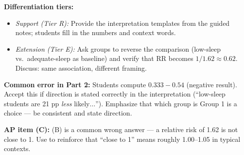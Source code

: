 \documentclass[10pt]{article}
\begin{document}
\begin{teachernote}
\textbf{Differentiation tiers:}
\begin{itemize}[leftmargin=1.4em, itemsep=2pt]
  \item \textit{Support (Tier R):} Provide the interpretation templates from the guided notes;
        students fill in the numbers and context words.
  \item \textit{Extension (Tier E):} Ask groups to reverse the comparison (low-sleep vs.\
        adequate-sleep as baseline) and verify that RR becomes $1/1.62 \approx 0.62$.
        Discuss: same association, different framing.
\end{itemize}

\textbf{Common error in Part 2:} Students compute $0.333 - 0.54$ (negative result). Accept this
if direction is stated correctly in the interpretation (``low-sleep students are 21 pp \emph{less}
likely$\ldots$''). Emphasize that which group is Group 1 is a choice --- be consistent and state direction.

\textbf{AP item (C):} (B) is a common wrong answer --- a relative risk of 1.62 is not close to 1.
Use to reinforce that ``close to 1'' means roughly 1.00--1.05 in typical contexts.
\end{teachernote}
\end{document}

